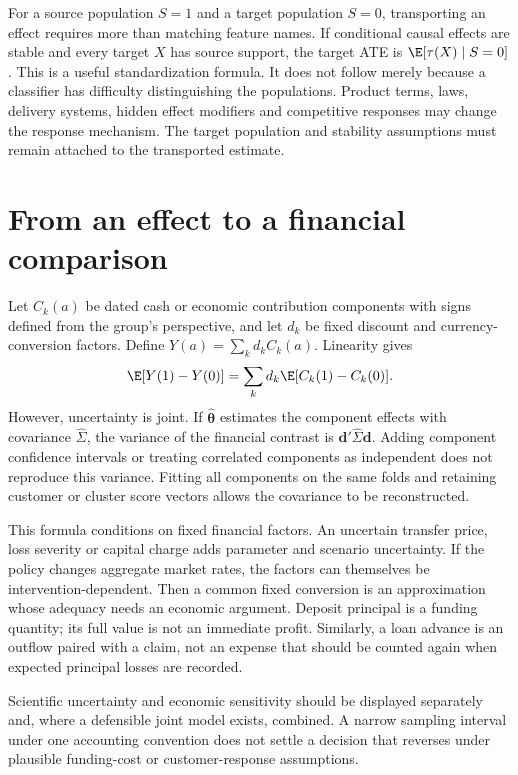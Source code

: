 For a source population $S=1$ and a target population $S=0$, transporting
an effect requires more than matching feature names. If conditional causal
effects are stable and every target $X$ has source support, the target
ATE is $\E[\tau(X)\mid S=0]$. This is a useful standardization formula.
It does not follow merely because a classifier has difficulty distinguishing
the populations. Product terms, laws, delivery systems, hidden effect
modifiers and competitive responses may change the response mechanism.
The target population and stability assumptions must remain attached to
the transported estimate.

\section{From an effect to a financial comparison}
Let $C_k(a)$ be dated cash or economic contribution components with signs
defined from the group's perspective, and let $d_k$ be fixed discount and
currency-conversion factors. Define $Y(a)=\sum_k d_k C_k(a)$.
Linearity gives
\[
 \E[Y(1)-Y(0)]=\sum_k d_k\E[C_k(1)-C_k(0)].
\]
However, uncertainty is joint. If $\widehat{\boldsymbol\theta}$ estimates
the component effects with covariance $\widehat\Sigma$, the variance
of the financial contrast is $\boldsymbol d'\widehat\Sigma\boldsymbol d$.
Adding component confidence intervals or treating correlated components as
independent does not reproduce this variance. Fitting all components on
the same folds and retaining customer or cluster score vectors allows
the covariance to be reconstructed.

This formula conditions on fixed financial factors. An uncertain transfer
price, loss severity or capital charge adds parameter and scenario uncertainty.
If the policy changes aggregate market rates, the factors can themselves
be intervention-dependent. Then a common fixed conversion is an approximation
whose adequacy needs an economic argument. Deposit principal is a funding
quantity; its full value is not an immediate profit. Similarly, a loan
advance is an outflow paired with a claim, not an expense that should be
counted again when expected principal losses are recorded.

Scientific uncertainty and economic sensitivity should be displayed separately
and, where a defensible joint model exists, combined. A narrow sampling interval
under one accounting convention does not settle a decision that reverses
under plausible funding-cost or customer-response assumptions.
